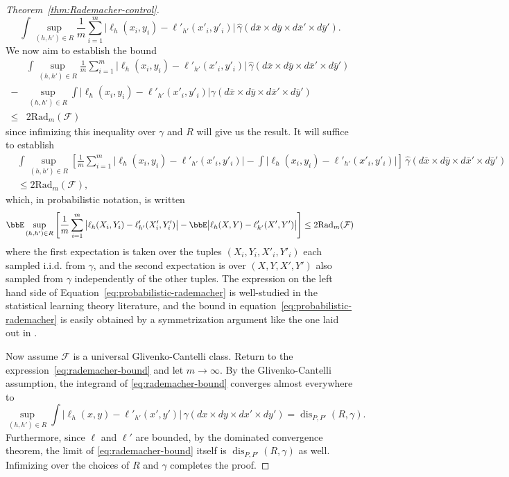 \documentclass[twoside,11pt]{article}
\DeclareMathOperator{\dis}{dis}
\newcommand{\rad}{\mathrm{Rad}}%
\begin{document}
\begin{proof}[Theorem~\ref{thm:Rademacher-control}]
\begin{equation}
        \int \sup_{(h,h')\in R} \frac{1}{m} \sum_{i=1}^m \big|\ell_h(x_i,y_i) - \ell'_{h'}(x'_i,y'_i)\big|
        \,\widehat \gamma(d\overline x {\times} d\overline y {\times} d\overline x' {\times} d\overline y').
    \end{equation}
    We now aim to establish the bound
    \begin{align*}
         & \int \sup_{(h,h')\in R} \frac{1}{m} \sum_{i=1}^m \big|\ell_h(x_i,y_i) - \ell'_{h'}(x'_i,y'_i)\big|
        \,\widehat \gamma(d\overline x {\times} d\overline y {\times} d\overline x' {\times} d\overline y')
        \\ - & \sup_{(h,h')\in R} \int \big|\ell_h(x_i,y_i)
        - \ell'_{h'}(x'_i,y'_i)\big| \gamma(d\overline x {\times} d\overline y {\times} d\overline x' {\times} d\overline y')
        \\ \leq & 2\rad_m(\mathcal F)
    \end{align*}
    since infimizing this inequality over $\gamma$ and $R$ will give us the result.
    It will suffice to establish
    \begin{align*}
        &\int \sup_{(h,h')\in R} \left[\frac{1}{m} \sum_{i=1}^m \big|\ell_h(x_i,y_i) - \ell'_{h'}(x'_i,y'_i)\big| - \int \big|\ell_h(x_i,y_i) - \ell'_{h'}(x'_i,y'_i) \big|\right]
        \,\widehat \gamma(d\overline x {\times} d\overline y {\times} d\overline x' {\times} d\overline y') \\& \leq 2\rad_m(\mathcal F),
    \end{align*}
    which, in probabilistic notation, is written
    \begin{equation}\label{eq:probabilistic-rademacher}
    \bbE \sup_{(h,h')\in R} \left[
        \frac{1}{m} \sum_{i=1}^m \big|\ell_h(X_i,Y_i) - \ell'_{h'}(X'_i,Y'_i)\big| - \bbE \big|\ell_h(X,Y) - \ell'_{h'}(X',Y')\big|
    \right]
    \leq 2\rad_m(\mathcal F)
    \end{equation}
    where the first expectation is taken over the tuples $(X_i,Y_i, X'_i, Y'_i)$ each sampled i.i.d. from $\gamma$, and the second expectation is over $(X,Y,X',Y')$ also sampled from $\gamma$ independently of the other tuples. The expression on the left hand side of Equation~\ref{eq:probabilistic-rademacher} is well-studied in the statistical learning theory literature, and the bound in equation~\ref{eq:probabilistic-rademacher} is easily obtained by a symmetrization argument like the one laid out in \cite[Theorem 4.1]{liao}.
    
    Now assume $\mathcal F$ is a universal Glivenko-Cantelli class. Return to the expression~\eqref{eq:rademacher-bound} and let $m\to \infty$.
    By the Glivenko-Cantelli assumption, the integrand of \eqref{eq:rademacher-bound} converges almost everywhere to
    \[\sup_{(h,h')\in R} \int \big | \ell_h(x,y) - \ell'_{h'}(x',y')\big| \, \gamma(dx{\times} dy {\times} dx'{\times} dy') = \dis_{P,P'}(R,\gamma).\]
    Furthermore, since $\ell$ and $\ell'$ are bounded, by the dominated convergence theorem, the limit of \eqref{eq:rademacher-bound} itself is $\dis_{P,P'}(R,\gamma)$ as well. Infimizing over the choices of $R$ and $\gamma$ completes the proof.
\end{proof}
\end{document}
